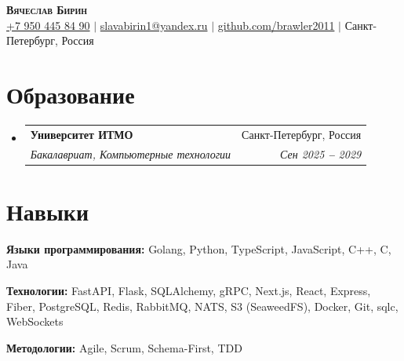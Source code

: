 \documentclass[letterpaper,11pt]{article}
\makeatletter
\newcommand{\resumeSubheading}[4]{
  \vspace{-2pt}\item
    \begin{tabular*}{0.97\textwidth}[t]{l@{\extracolsep{\fill}}r}
      \textbf{#1} & #2 \\
      \textit{\small#3} & \textit{\small #4} \\
    \end{tabular*}\vspace{-7pt}
}
\newcommand{\resumeSubHeadingListStart}{\begin{itemize}[leftmargin=0.15in, label={}]}
\newcommand{\resumeSubHeadingListEnd}{\end{itemize}}
\makeatother
\begin{document}

\begin{center}
    \textbf{\Huge \scshape Вячеслав Бирин} \\ \vspace{3pt}
    \small
    \faMobile \hspace{.5pt} \href{tel:+79504458490}{+7 950 445 84 90}
    $|$
    \faAt \hspace{.5pt} \href{mailto:slavabirin1@yandex.ru}{slavabirin1@yandex.ru}
    $|$
    \faGithub \hspace{.5pt} \href{https://github.com/brawler2011}{github.com/brawler2011}
    $|$
    \faMapMarker \hspace{.5pt} {Санкт-Петербург, Россия}
\end{center}




\section{Образование}
  \vspace{3pt}
  \resumeSubHeadingListStart
    
    \resumeSubheading
      {Университет ИТМО}{Санкт-Петербург, Россия}
      {Бакалавриат, Компьютерные технологии}{Сен 2025 \textbf{--} 2029}
    
  \resumeSubHeadingListEnd




\section{Навыки}
  \vspace{2pt}
  \resumeSubHeadingListStart
    \small{\item{
        
        \textbf{Языки программирования:}{ Golang, Python, TypeScript, JavaScript, C++, C, Java} \\ \vspace{3pt}
        
        \textbf{Технологии:}{ FastAPI, Flask, SQLAlchemy, gRPC, Next.js, React, Express, Fiber, PostgreSQL, Redis, RabbitMQ, NATS, S3 (SeaweedFS), Docker, Git, sqlc, WebSockets} \\ \vspace{3pt}
        
        \textbf{Методологии:}{ Agile, Scrum, Schema-First, TDD} \\ \vspace{3pt}
        
    }}
  \resumeSubHeadingListEnd
\end{document}
